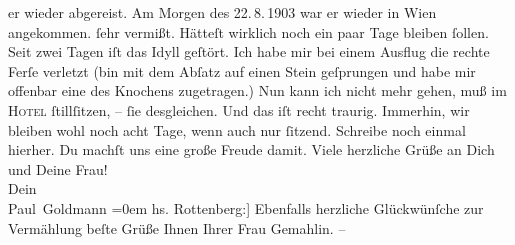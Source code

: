 \begin{ledgroupsized}[t]{13cm}
{{{                  er wieder abgereist. Am Morgen des 22. 8. 1903 war er wieder in Wien angekommen.}}}\label{K_L03385-5h} ſehr vermißt. Hätteſt wirklich noch
               ein paar Tage bleiben ſollen.\pend
           \pstart
           Seit zwei Tagen iſt das Idyll geſtört. Ich habe mir bei einem Ausflug die \introOben{}rechte\introOben{} Ferſe verletzt (bin mit dem Abſatz auf einen Stein
               geſprungen und habe mir offenbar eine \label{K_L03385-4v}\label{K_L03385-4h} des Knochens zugetragen.) Nun kann ich nicht mehr {\pb}gehen, muß im \textsc{Hotel}{ } ſtillſitzen, – ſie desgleichen. Und das iſt
               recht traurig.\pend
           \pstart
           Immerhin, wir bleiben wohl noch acht Tage, wenn auch nur ſitzend. Schreibe noch
               einmal hierher. Du machſt uns eine große Freude damit.\pend
           \pstart
           Viele herzliche Grüße an Dich und Deine Frau! {\\[\baselineskip]}Dein {\\[\baselineskip]}\spacefill\mbox{Paul Goldmann}\pend
           \leftskip=0em{}\pstart
           \noindent{}{[}hs. Rottenberg:{]} Ebenfalls herzliche Glückwünſche zur Vermählung {\kaufmannsund} beſte Grüße Ihnen {\kaufmannsund}
                  Ihrer Frau Gemahlin. –\pend
           
         
         \endnumbering{}\end{ledgroupsized}  \newcommand{\dateiname}{L03385}\newcommand{\titel}{Paul Goldmann und Theodore Rottenberg an Arthur Schnitzler, 29. 8. 1903}\newcommand{\editorInnen}{Martin Anton Müller und Laura Untner}
      